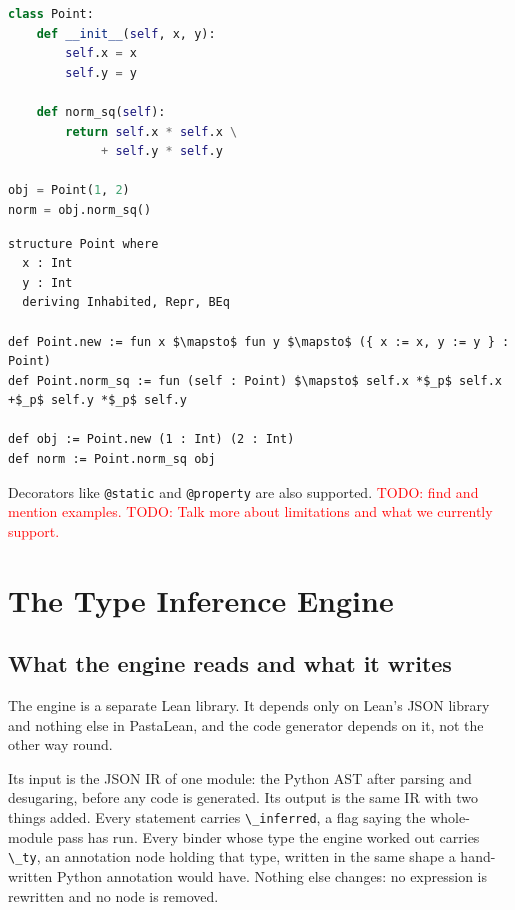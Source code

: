 \documentclass{article}
\newcommand{\code}{\lstinline}
\newcommand{\todo}[1]{\textcolor{red}{TODO: #1}}
\begin{document}
\noindent
\begin{minipage}[t]{0.48\textwidth}
\begin{lstlisting}[language=python, caption={Python \texttt{Point} class.}, label={lst:oop-py}, breaklines=true]
class Point:
    def __init__(self, x, y):
        self.x = x
        self.y = y

    def norm_sq(self):
        return self.x * self.x \
             + self.y * self.y

obj = Point(1, 2)
norm = obj.norm_sq()
\end{lstlisting}
\end{minipage}%
\hfill
\begin{minipage}[t]{0.48\textwidth}
\begin{lstlisting}[language=lean, caption={Lean 4 translation.}, label={lst:oop-lean}, breaklines=true, mathescape=true]
structure Point where
  x : Int
  y : Int
  deriving Inhabited, Repr, BEq

def Point.new := fun x $\mapsto$ fun y $\mapsto$ ({ x := x, y := y } : Point)
def Point.norm_sq := fun (self : Point) $\mapsto$ self.x *$_p$ self.x +$_p$ self.y *$_p$ self.y

def obj := Point.new (1 : Int) (2 : Int)
def norm := Point.norm_sq obj
\end{lstlisting}
\end{minipage}

Decorators like \code{@static} and \code{@property} are also supported. \todo{find and mention examples.}
\todo{Talk more about limitations and what we currently support.}


\section{The Type Inference Engine}\label{app:typeinfer}

\subsection{What the engine reads and what it writes}\label{app:ti-io}

The engine is a separate Lean library. It depends only on Lean's JSON library and nothing else in PastaLean, and the code generator depends on it, not the other way round.

Its input is the JSON IR of one module: the Python AST after parsing and desugaring, before any code is generated. Its output is the same IR with two things added. Every statement carries \code{\_inferred}, a flag saying the whole-module pass has run. Every binder whose type the engine worked out carries \code{\_ty}, an annotation node holding that type, written in the same shape a hand-written Python annotation would have. Nothing else changes: no expression is rewritten and no node is removed.
\end{document}
